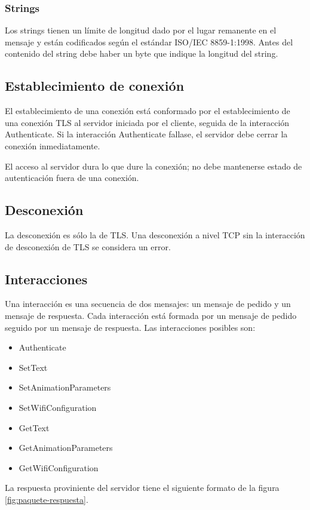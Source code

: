 \subsubsection{Strings}
Los strings tienen un límite de longitud dado por el lugar remanente en el mensaje y están codificados según el estándar ISO/IEC 8859-1:1998. Antes del contenido del string debe haber un byte que indique la longitud del string.

\subsection{Establecimiento de conexión}
El establecimiento de una conexión está conformado por el establecimiento de una conexión TLS al servidor iniciada por el cliente, seguida de la interacción Authenticate. Si la interacción Authenticate fallase, el servidor debe cerrar la conexión inmediatamente.

El acceso al servidor dura lo que dure la conexión; no debe mantenerse estado de autenticación fuera de una conexión.

\subsection{Desconexión}
La desconexión es sólo la de TLS. Una desconexión a nivel TCP sin la interacción de desconexión de TLS se considera un error.

\subsection{Interacciones}
Una interacción es una secuencia de dos mensajes: un mensaje de pedido y un mensaje de respuesta. Cada interacción está formada por un mensaje de pedido seguido por un mensaje de respuesta.
Las interacciones posibles son:

\begin{itemize}
	\item Authenticate
	\item SetText
	\item SetAnimationParameters
	\item SetWifiConfiguration
	\item GetText
	\item GetAnimationParameters
	\item GetWifiConfiguration
\end{itemize}

La respuesta proviniente del servidor tiene el siguiente formato de la figura \ref{fig:paquete-respuesta}.


